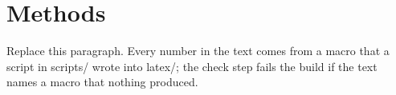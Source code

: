 \section{Methods}

Replace this paragraph. Every number in the text comes from a macro that a script in scripts/ wrote into latex/;
the check step fails the build if the text names a macro that nothing produced.
